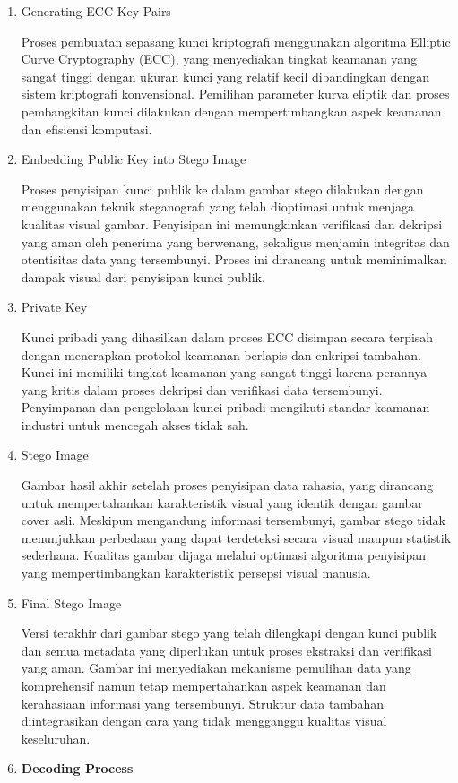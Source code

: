 \documentclass{ittelkom}
\begin{document}
\begin{enumerate}
    \item Generating ECC Key Pairs

          Proses pembuatan sepasang kunci kriptografi menggunakan algoritma Elliptic
          Curve Cryptography (ECC), yang menyediakan tingkat keamanan yang sangat tinggi
          dengan ukuran kunci yang relatif kecil dibandingkan dengan sistem kriptografi
          konvensional. Pemilihan parameter kurva eliptik dan proses pembangkitan kunci
          dilakukan dengan mempertimbangkan aspek keamanan dan efisiensi komputasi.

    \item Embedding Public Key into Stego Image

          Proses penyisipan kunci publik ke dalam gambar stego dilakukan dengan
          menggunakan teknik steganografi yang telah dioptimasi untuk menjaga kualitas
          visual gambar. Penyisipan ini memungkinkan verifikasi dan dekripsi yang aman
          oleh penerima yang berwenang, sekaligus menjamin integritas dan otentisitas
          data yang tersembunyi. Proses ini dirancang untuk meminimalkan dampak visual
          dari penyisipan kunci publik.

    \item Private Key

          Kunci pribadi yang dihasilkan dalam proses ECC disimpan secara terpisah dengan
          menerapkan protokol keamanan berlapis dan enkripsi tambahan. Kunci ini memiliki
          tingkat keamanan yang sangat tinggi karena perannya yang kritis dalam proses
          dekripsi dan verifikasi data tersembunyi. Penyimpanan dan pengelolaan kunci
          pribadi mengikuti standar keamanan industri untuk mencegah akses tidak sah.

    \item Stego Image

          Gambar hasil akhir setelah proses penyisipan data rahasia, yang dirancang untuk
          mempertahankan karakteristik visual yang identik dengan gambar cover asli.
          Meskipun mengandung informasi tersembunyi, gambar stego tidak menunjukkan
          perbedaan yang dapat terdeteksi secara visual maupun statistik sederhana.
          Kualitas gambar dijaga melalui optimasi algoritma penyisipan yang
          mempertimbangkan karakteristik persepsi visual manusia.

    \item Final Stego Image

          Versi terakhir dari gambar stego yang telah dilengkapi dengan kunci publik dan
          semua metadata yang diperlukan untuk proses ekstraksi dan verifikasi yang aman.
          Gambar ini menyediakan mekanisme pemulihan data yang komprehensif namun tetap
          mempertahankan aspek keamanan dan kerahasiaan informasi yang tersembunyi.
          Struktur data tambahan diintegrasikan dengan cara yang tidak mengganggu
          kualitas visual keseluruhan.
    \item \textbf{Decoding Process}


\end{enumerate}
\end{document}
